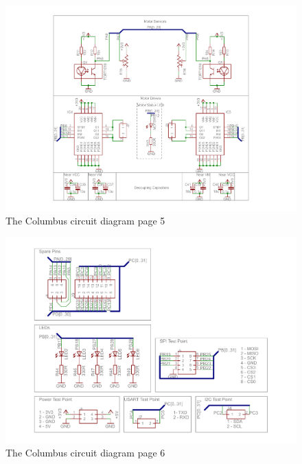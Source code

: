 \begin{figure}
\centering
\includegraphics[width=\textheight,keepaspectratio]{./Figures/ColumbusCircuitPage5.pdf}
\caption{The Columbus circuit diagram page 5}
\label{sch:Columbus_Schematic:5}
\end{figure}

\begin{figure}
\centering
\includegraphics[width=\textheight,keepaspectratio]{./Figures/ColumbusCircuitPage6.pdf}
\caption{The Columbus circuit diagram page 6}
\label{sch:Columbus_Schematic:6}
\end{figure}

